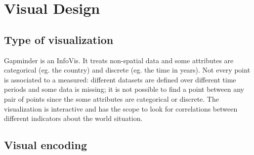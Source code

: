 \section{Visual Design}
\label{sec:visual_design}

\subsection{Type of visualization}
Gapminder is an InfoVis.
It treats non-spatial data and some attributes are categorical (eg. the country) and discrete (eg. the time in years).
Not every point is associated to a measured: different datasets are defined over different time periods and some data is missing; it is not possible to find a point between any pair of points since the some attributes are categorical or discrete.
The visualization is interactive and has the scope to look for correlations between different indicators about the world situation.

\subsection{Visual encoding}

